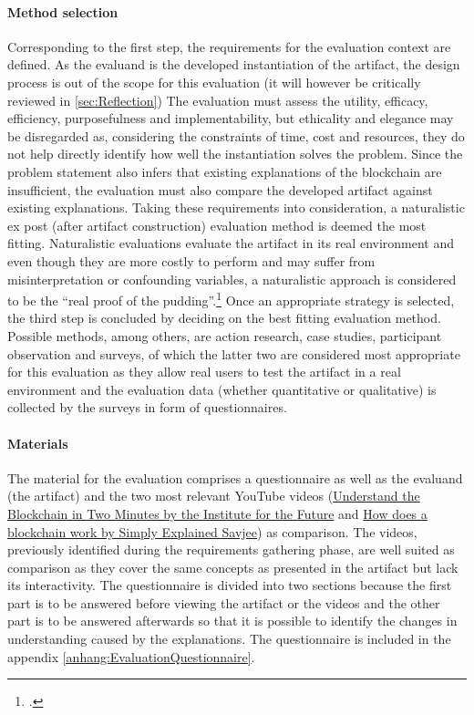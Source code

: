 \paragraph{Method selection} Corresponding to the first step, the requirements for the evaluation context are defined. As the evaluand is the developed instantiation of the artifact, the design process is out of the scope for this evaluation (it will however be critically reviewed in \ref{sec:Reflection}) The evaluation must assess the utility, efficacy, efficiency, purposefulness and implementability, but ethicality and elegance may be disregarded as, considering the constraints of time, cost and resources, they do not help directly identify how well the instantiation solves the problem. Since the problem statement also infers that existing explanations of the blockchain are insufficient, the evaluation must also compare the developed artifact against existing explanations. Taking these requirements into consideration, a naturalistic ex post (after artifact construction) evaluation method is deemed the most fitting. Naturalistic evaluations evaluate the artifact in its real environment and even though they are more costly to perform and may suffer from misinterpretation or confounding variables, a naturalistic approach is considered to be the \enquote{real proof of the pudding}.\footcites[Cf.][p.6, p.3 et seq]{Pries-HejeStrategiesDesignScience}[cf.][p.80]{PfeffersDesignScienceResearch2012} Once an appropriate strategy is selected, the third step is concluded by deciding on the best fitting evaluation method. Possible methods, among others, are action research, case studies, participant observation and surveys, of which the latter two are considered most appropriate for this evaluation as they allow real users to test the artifact in a real environment and the evaluation data (whether quantitative or qualitative) is collected by the surveys in form of questionnaires.  

\paragraph{Materials} The material for the evaluation comprises a questionnaire as well as the evaluand (the artifact) and the two most relevant YouTube videos (\href{https://www.youtube.com/watch?v=r43LhSUUGTQ}{Understand the Blockchain in Two Minutes by the Institute for the Future} and \href{https://www.youtube.com/watch?v=SSo_EIwHSd4}{How does a blockchain work by Simply Explained Savjee}) as comparison. The videos, previously identified during the requirements gathering phase, are well suited as comparison as they cover the same concepts as presented in the artifact but lack its interactivity. The questionnaire is divided into two sections because the first part is to be answered before viewing the artifact or the videos and the other part is to be answered afterwards so that it is possible to identify the changes in understanding caused by the explanations. The questionnaire is included in the appendix \ref{anhang:EvaluationQuestionnaire}. 

